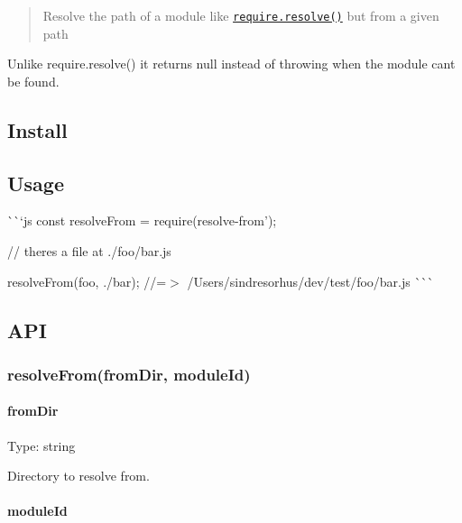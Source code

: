 \begin{quote}
Resolve the path of a module like \href{http://nodejs.org/api/globals.html#globals_require_resolve}{\tt {\ttfamily require.\+resolve()}} but from a given path \end{quote}


Unlike {\ttfamily require.\+resolve()} it returns {\ttfamily null} instead of throwing when the module can\textquotesingle{}t be found.

\subsection*{Install}




\subsection*{Usage}

\`{}\`{}`js const resolve\+From = require(\textquotesingle{}resolve-\/from');

// there\textquotesingle{}s a file at {\ttfamily ./foo/bar.js}

resolve\+From(\textquotesingle{}foo\textquotesingle{}, \textquotesingle{}./bar\textquotesingle{}); //=$>$ \textquotesingle{}/\+Users/sindresorhus/dev/test/foo/bar.js\textquotesingle{} \`{}\`{}\`{}

\subsection*{A\+PI}

\subsubsection*{resolve\+From(from\+Dir, module\+Id)}

\paragraph*{from\+Dir}

Type\+: {\ttfamily string}

Directory to resolve from.

\paragraph*{module\+Id}

